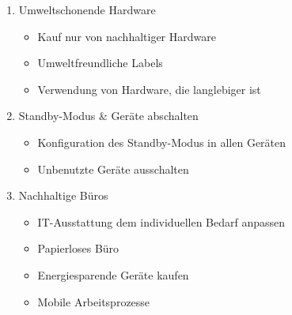 \documentclass[a4paper]{article}
\begin{document}
\begin{multicols}{2}
\begin{enumerate}
                \item Umweltschonende Hardware
                \begin{itemize}
                    \color{blue}
                    \item Kauf nur von nachhaltiger Hardware
                    \item Umweltfreundliche Labels
                    \item Verwendung von Hardware, die langlebiger ist
                \end{itemize}
                \color{magenta}
                \item Standby-Modus \& Geräte abschalten
                \begin{itemize}
                    \color{blue}
                    \item Konfiguration des Standby-Modus in allen Geräten
                    \item Unbenutzte Geräte ausschalten
                \end{itemize}
                \color{magenta}
                \item Nachhaltige Büros
                \begin{itemize}
                    \color{blue}
                    \item IT-Ausstattung dem individuellen Bedarf
                    anpassen
                    \item Papierloses Büro
                    \item Energiesparende Geräte kaufen
                    \item Mobile Arbeitsprozesse
                \end{itemize}
            \end{enumerate}
        \end{multicols}
\end{document}

